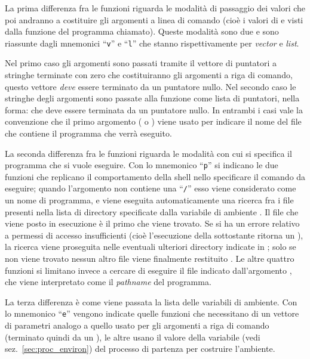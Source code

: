 La prima differenza fra le funzioni riguarda le modalità di passaggio dei
valori che poi andranno a costituire gli argomenti a linea di comando (cioè i
valori di  e  visti dalla funzione  del
programma chiamato). Queste modalità sono due e sono riassunte dagli mnemonici
``\texttt{v}'' e ``\texttt{l}'' che stanno rispettivamente per \textit{vector}
e \textit{list}.

Nel primo caso gli argomenti sono passati tramite il vettore di puntatori
 a stringhe terminate con zero che costituiranno gli argomenti a
riga di comando, questo vettore \emph{deve} essere terminato da un puntatore
nullo. Nel secondo caso le stringhe degli argomenti sono passate alla funzione
come lista di puntatori, nella forma:
che deve essere terminata da un puntatore nullo.  In entrambi i casi vale la
convenzione che il primo argomento ( o ) viene usato
per indicare il nome del file che contiene il programma che verrà eseguito.

La seconda differenza fra le funzioni riguarda le modalità con cui si
specifica il programma che si vuole eseguire. Con lo mnemonico ``\texttt{p}''
si indicano le due funzioni che replicano il comportamento della shell nello
specificare il comando da eseguire; quando l'argomento  non
contiene una ``\texttt{/}'' esso viene considerato come un nome di programma,
e viene eseguita automaticamente una ricerca fra i file presenti nella lista
di directory specificate dalla variabile di ambiente . Il file
che viene posto in esecuzione è il primo che viene trovato. Se si ha un errore
relativo a permessi di accesso insufficienti (cioè l'esecuzione della
sottostante  ritorna un ), la ricerca viene
proseguita nelle eventuali ulteriori directory indicate in ; solo
se non viene trovato nessun altro file viene finalmente restituito
.  Le altre quattro funzioni si limitano invece a cercare di
eseguire il file indicato dall'argomento , che viene interpretato
come il \textit{pathname} del programma.

La terza differenza è come viene passata la lista delle variabili di ambiente.
Con lo mnemonico ``\texttt{e}'' vengono indicate quelle funzioni che
necessitano di un vettore di parametri  analogo a quello usato per
gli argomenti a riga di comando (terminato quindi da un ), le altre
usano il valore della variabile  (vedi
sez.~\ref{sec:proc_environ}) del processo di partenza per costruire
l'ambiente.

